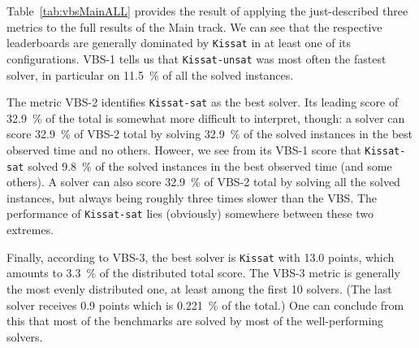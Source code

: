\documentclass{elsarticle}
\newcommand{\todo}[1]{{\color{purple}Todo: #1}}
\newcommand{\solver}[1]{\texttt{#1}}
\begin{document}

Table~\ref{tab:vbsMainALL} provides the result of applying the just-described three metrics 
to the full results of the Main track. We can see that the respective leaderboards 
are generally dominated by \solver{Kissat} in at least one of its configurations.
VBS-1 tells us that \solver{Kissat-unsat} was most often the fastest solver,
in particular on \SI{11.5}{\percent} of all the solved instances.

The metric VBS-2 identifies \solver{Kissat-sat} as the best solver. Its leading score of \SI{32.9}{\percent} of the total
is somewhat more difficult to interpret, though: a solver can score \SI{32.9}{\percent} of VBS-2 total
by solving \SI{32.9}{\percent} of the solved instances in the best observed time
and no others. Howeer,  we see from its VBS-1 score that \solver{Kissat-sat} solved \SI{9.8}{\percent}
of the solved instances in the best observed time (and some others).
A solver can also score \SI{32.9}{\percent} of VBS-2 total by solving all the solved instances,
but always being roughly three times slower than the VBS. 
The performance of \solver{Kissat-sat} lies (obviously) somewhere between these two extremes.

Finally, according to VBS-3, the best solver is \solver{Kissat} with 13.0 points,
which amounts to \SI{3.3}{\percent} of the distributed total score.
The VBS-3 metric is generally the most evenly distributed one,
at least among the first 10 solvers. 
(The last solver receives 0.9 points which is \SI{0.221}{\percent} of the total.)
One can conclude from this that most of the benchmarks are solved
by most of the well-performing solvers. 
\end{document}

